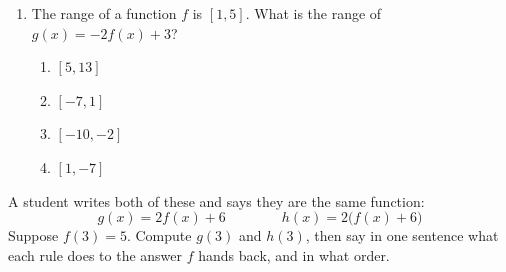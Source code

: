 \documentclass[10pt]{article}
\begin{document}
\begin{enumerate}[itemsep=10pt]
\begin{enumerate}[label=(\alph*), itemsep=6pt]
        \begin{work}
           &= 2 - 1 = 1 \\
           &= 2(7) - 5 = 9
        \end{work}

        It lands at ( \blank{1.4cm} , \blank{1.4cm} ).

  \item Domain of $g$:

        \begin{work}
          -4 &\le x + 1  \\
          -5 &\le x 
        \end{work}

        Domain of $g$: \blank{3cm}

  \item Range of $g$:

        \begin{work}
          2(-1) - 5 &= -7 \\
           2(7) - 5 &= 9
        \end{work}

        Range of $g$: \blank{3cm}

  \item Which piece of the rule moved the domain, and which moved the range?

        \vspace{0.05in}
        \writeline
\end{enumerate}

\item The range of a function $f$ is $[1, 5]$. What is the range of
      $g(x) = -2f(x) + 3$?

\begin{enumerate}[label=\Alph*., itemsep=3pt]
  \item $[5, 13]$
  \item $[-7, 1]$
  \item $[-10, -2]$
  \item $[1, -7]$
\end{enumerate}

\end{enumerate}

\vspace{0.1in}

\boxguard
\begin{extensionbox}
A student writes both of these and says they are the same function:
\[
  g(x) = 2f(x) + 6 \qquad\qquad h(x) = 2\bigl(f(x) + 6\bigr)
\]
Suppose $f(3) = 5$. Compute $g(3)$ and $h(3)$, then say in one sentence what
each rule does to the answer $f$ hands back, and in what order.

\vspace{0.05in}
\end{extensionbox}
\end{document}
